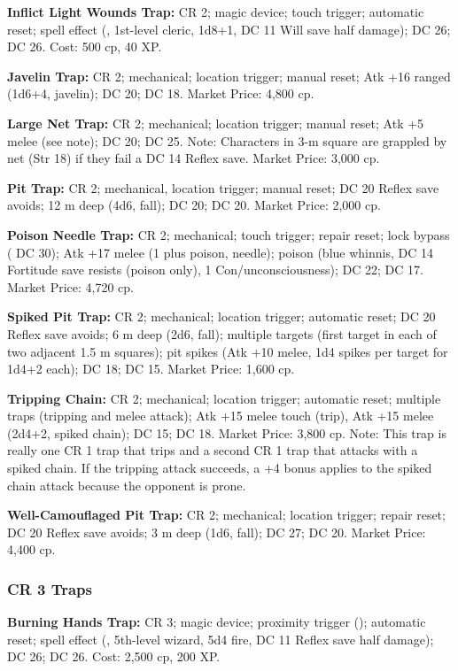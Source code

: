 \textbf{Inflict Light Wounds Trap:} CR 2; magic device; touch trigger; automatic reset; spell effect (, 1st-level cleric, 1d8+1, DC 11 Will save half damage);  DC 26;  DC 26. Cost: 500 cp, 40 XP.

\textbf{Javelin Trap:} CR 2; mechanical; location trigger; manual reset; Atk +16 ranged (1d6+4, javelin);  DC 20;  DC 18. Market Price: 4,800 cp.

\textbf{Large Net Trap:} CR 2; mechanical; location trigger; manual reset; Atk +5 melee (see note);  DC 20;  DC 25. Note: Characters in 3-m square are grappled by net (Str 18) if they fail a DC 14 Reflex save. Market Price: 3,000 cp.

\textbf{Pit Trap:} CR 2; mechanical, location trigger; manual reset; DC 20 Reflex save avoids; 12 m deep (4d6, fall);  DC 20;  DC 20. Market Price: 2,000 cp.

\textbf{Poison Needle Trap:} CR 2; mechanical; touch trigger; repair reset; lock bypass ( DC 30); Atk +17 melee (1 plus poison, needle); poison (blue whinnis, DC 14 Fortitude save resists (poison only), 1 Con/unconsciousness);  DC 22;  DC 17. Market Price: 4,720 cp.

\textbf{Spiked Pit Trap:} CR 2; mechanical; location trigger; automatic reset; DC 20 Reflex save avoids; 6 m deep (2d6, fall); multiple targets (first target in each of two adjacent 1.5 m squares); pit spikes (Atk +10 melee, 1d4 spikes per target for 1d4+2 each);  DC 18;  DC 15. Market Price: 1,600 cp.

\textbf{Tripping Chain:} CR 2; mechanical; location trigger; automatic reset; multiple traps (tripping and melee attack); Atk +15 melee touch (trip), Atk +15 melee (2d4+2, spiked chain);  DC 15;  DC 18. Market Price: 3,800 cp. Note: This trap is really one CR 1 trap that trips and a second CR 1 trap that attacks with a spiked chain. If the tripping attack succeeds, a +4 bonus applies to the spiked chain attack because the opponent is prone.

\textbf{Well-Camouflaged Pit Trap:} CR 2; mechanical; location trigger; repair reset; DC 20 Reflex save avoids; 3 m deep (1d6, fall);  DC 27;  DC 20. Market Price: 4,400 cp.

\subsubsection{CR 3 Traps}
\textbf{Burning Hands Trap:} CR 3; magic device; proximity trigger (); automatic reset; spell effect (, 5th-level wizard, 5d4 fire, DC 11 Reflex save half damage);  DC 26;  DC 26. Cost: 2,500 cp, 200 XP.

